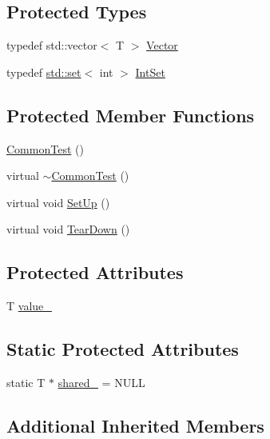 \subsection*{Protected Types}
\begin{DoxyCompactItemize}
\item 
typedef std\+::vector$<$ T $>$ \hyperlink{classCommonTest_a6dfdcede6964887b9f4254a0e0478e37}{Vector}
\item 
typedef \hyperlink{vendor_2googletest_2googlemock_2CMakeLists_8txt_aa99cc432a5064db15e7653de9d85d2d2}{std\+::set}$<$ int $>$ \hyperlink{classCommonTest_a62827e9d3064cddf4a8698747f1bd434}{Int\+Set}
\end{DoxyCompactItemize}
\subsection*{Protected Member Functions}
\begin{DoxyCompactItemize}
\item 
\hyperlink{classCommonTest_abd5ec205d90f4b81efab2a6f972f3db0}{Common\+Test} ()
\item 
virtual \hyperlink{classCommonTest_a675a632fcf7b1fd961fefc619d6a458d}{$\sim$\+Common\+Test} ()
\item 
virtual void \hyperlink{classCommonTest_a4c7bf7889ce48a9d06530bc4a437f3f5}{Set\+Up} ()
\item 
virtual void \hyperlink{classCommonTest_aeae195c2cefa956c6ae5be1226e6ecd8}{Tear\+Down} ()
\end{DoxyCompactItemize}
\subsection*{Protected Attributes}
\begin{DoxyCompactItemize}
\item 
T \hyperlink{classCommonTest_ae59c4abcb833625a7baeb2048531ebec}{value\+\_\+}
\end{DoxyCompactItemize}
\subsection*{Static Protected Attributes}
\begin{DoxyCompactItemize}
\item 
static T $\ast$ \hyperlink{classCommonTest_a52368ce1e65a865db9bdccbcc2cedaac}{shared\+\_\+} = N\+U\+LL
\end{DoxyCompactItemize}
\subsection*{Additional Inherited Members}


